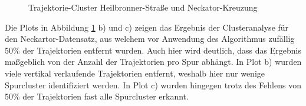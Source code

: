 \begin{figure}[H]
    \centering
    \caption{Trajektorie-Cluster Heilbronner-Straße und Neckator-Kreuzung}
    \label{fig:results_clusters}
\end{figure}

Die Plots in Abbildung \ref{fig:results_clusters} b) und c) zeigen das Ergebnis der Clusteranalyse für
den Neckartor-Datensatz, aus welchem vor Anwendung des Algorithmus zufällig 50\% der Trajektorien entfernt wurden.
Auch hier wird deutlich, dass das Ergebnis maßgeblich von der Anzahl der Trajektorien pro Spur abhängt.
In Plot b) wurden viele vertikal verlaufende Trajektorien entfernt, weshalb hier nur wenige Spurcluster identifiziert werden.
In Plot c) wurden hingegen trotz des Fehlens von 50\% der Trajektorien fast alle Spurcluster erkannt.

